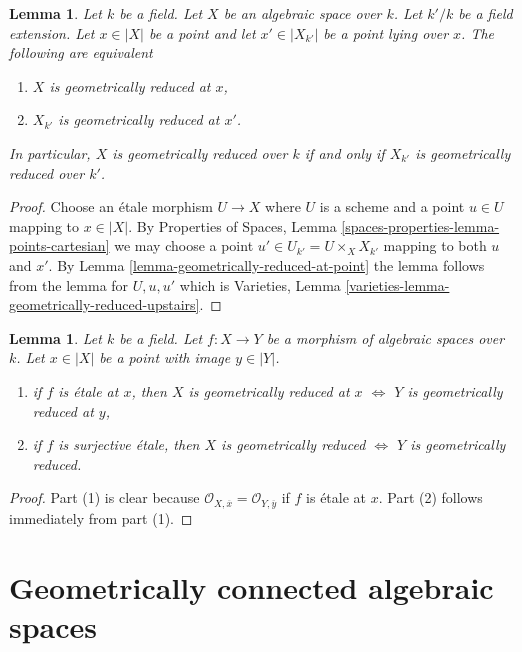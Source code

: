 \documentclass{stacks-project}
\theoremstyle{plain}
\newtheorem{lemma}[subsection]{Lemma}
\theoremstyle{definition}
\theoremstyle{remark}
\numberwithin{equation}{subsection}
\begin{document}
\begin{lemma}
\label{lemma-geometrically-reduced-upstairs}
Let $k$ be a field. Let $X$ be an algebraic space over $k$.
Let $k'/k$ be a field extension. Let $x \in |X|$ be a point and let
$x' \in |X_{k'}|$ be a point lying over $x$.
The following are equivalent
\begin{enumerate}
\item $X$ is geometrically reduced at $x$,
\item $X_{k'}$ is geometrically reduced at $x'$.
\end{enumerate}
In particular, $X$ is geometrically reduced over $k$ if and only if
$X_{k'}$ is geometrically reduced over $k'$.
\end{lemma}

\begin{proof}
Choose an \'etale morphism $U \to X$ where $U$ is a scheme
and a point $u \in U$ mapping to $x \in |X|$.
By Properties of Spaces, Lemma \ref{spaces-properties-lemma-points-cartesian}
we may choose a point $u' \in U_{k'} = U \times_X X_{k'}$ mapping
to both $u$ and $x'$. By Lemma \ref{lemma-geometrically-reduced-at-point}
the lemma follows from the lemma for $U, u, u'$ which is
Varieties, Lemma \ref{varieties-lemma-geometrically-reduced-upstairs}.
\end{proof}

\begin{lemma}
\label{lemma-geometrically-reduced-etale-local}
Let $k$ be a field. Let $f : X \to Y$ be a morphism of
algebraic spaces over $k$. Let $x \in |X|$ be a point
with image $y \in |Y|$.
\begin{enumerate}
\item if $f$ is \'etale at $x$, then
$X$ is geometrically reduced at $x$ $\Leftrightarrow$
$Y$ is geometrically reduced at $y$,
\item if $f$ is surjective \'etale, then
$X$ is geometrically reduced $\Leftrightarrow$
$Y$ is geometrically reduced.
\end{enumerate}
\end{lemma}

\begin{proof}
Part (1) is clear because
$\mathcal{O}_{X, \overline{x}} = \mathcal{O}_{Y, \overline{y}}$
if $f$ is \'etale at $x$.
Part (2) follows immediately from part (1).
\end{proof}






\section{Geometrically connected algebraic spaces}
\label{section-geometrically-connected}
\end{document}
